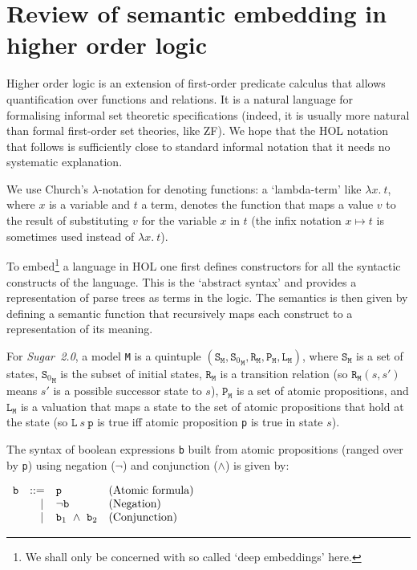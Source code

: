 \documentclass{llncs}
\newcommand\Sugar{{\it{Sugar~2.0}}\xspace}
\newcommand\Hol{HOL\xspace}
\renewcommand{\t}[1]{\texttt{#1}}
\renewcommand{\L}{\texttt{L}\xspace}
\begin{document}
\section{Review of semantic embedding in higher order logic}\label{review}

Higher order logic is an extension of first-order predicate calculus
that allows quantification over functions and relations. It is a
natural language for formalising informal set theoretic specifications
(indeed, it is usually more natural than formal first-order set
theories, like ZF).  We hope that the \Hol notation that follows is
sufficiently close to standard informal notation that it needs no
systematic explanation.

We use Church's $\lambda$-notation for denoting functions: 
a `lambda-term' like $\lambda x.~t$, where $x$
is a variable and $t$ a term, denotes the function 
that maps a value $v$ to the result of substituting $v$ for the
variable $x$ in $t$ (the infix notation $x \mapsto t$ is
sometimes used instead of $\lambda x.~t$).

To embed\footnote{We shall only be concerned with so called `deep
embeddings' here.}  a language in \Hol one first defines constructors
for all the syntactic constructs of the language. This is the
`abstract syntax' and provides a representation of parse trees as
terms in the logic.  The semantics is then given by defining a
semantic function that recursively maps each construct to a
representation of its meaning.

For \Sugar, a model \t{M} is a quintuple
$(\t{S}_{\t{M}},{\t{S}_0}_{\t{M}},\t{R}_{\t{M}},\t{P}_{\t{M}},\t{L}_{\t{M}})$, where $\t{S}_{\t{M}}$
is a set of states, ${\t{S}_0}_{\t{M}}$ is the subset of initial states, $\t{R}_{\t{M}}$ is a
transition relation (so $\t{R}_{\t{M}}(s,s')$ means $s'$ is a possible
successor state to $s$), $\t{P}_{\t{M}}$ is a set of atomic propositions, and
$\L_{\t{M}}$ is a valuation that maps a state to the
set of atomic propositions that hold at the state
(so $\L~s~\t{p}$ is true iff atomic proposition
\t{p} is true in state $s$).

The syntax of boolean expressions \t{b}
built from atomic propositions
(ranged over by \t{p}) using negation ($\neg$) and conjunction ($\wedge$)
is given by:


\medskip

$\begin{array}{ccll}
{\t{b}} & {\rm ::=} & \t{p}
  & \mbox{\rm(Atomic formula)}\\
 & \phantom{\rm ::}\mid & \neg{\t{b}}
  & \mbox{\rm(Negation)}\\
 & \phantom{\rm ::}\mid & {\t{b}}_1~\wedge~{\t{b}}_2
  & \mbox{\rm(Conjunction)}\\
\end{array}$
\end{document}
